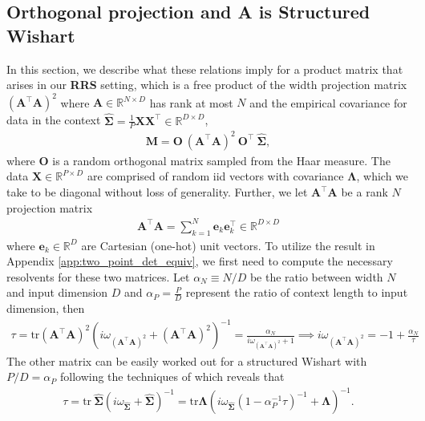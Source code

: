 \documentclass{article} %
\begin{document}
\subsection{Orthogonal projection and A is Structured Wishart}\label{app:orthogonal_proj_structured_Wishart}

In this section, we describe what these relations imply for a product matrix that arises in our \textbf{RRS} setting, which is a free product of the width projection matrix $(\bm A^\top \bm A)^2$ where $\bm A \in \mathbb{R}^{N \times D}$ has rank at most $N$ and the empirical covariance for data in the context $\hat{\bm\Sigma} = \frac{1}{P} \bm X \bm X^\top \in \mathbb{R}^{D\times D}$,
\begin{align}
    \bm M = \bm O \  \left( \bm A^\top \bm A \right)^2 \  \bm O^\top \ \hat{\bm\Sigma} ,
\end{align}
where $\bm O$ is a random orthogonal matrix sampled from the Haar measure. The data $\bm X \in \mathbb{R}^{P \times D}$ are comprised of random iid vectors with covariance $\bm\Lambda$, which we take to be diagonal without loss of generality. Further, we let $\bm A^\top \bm A$ be a rank $N$ projection matrix
\begin{align}
      \bm A^\top \bm A  =  \sum_{k=1}^N \bm e_k \bm e_k^\top \in \mathbb{R}^{D \times D}
\end{align}
where $\bm e_k \in \mathbb{R}^{D}$ are Cartesian (one-hot) unit vectors. To utilize the result in Appendix \ref{app:two_point_det_equiv}, we first need to compute the necessary resolvents for these two matrices. Let $\alpha_N \equiv N/D$ be the ratio between width $N$ and input dimension $D$ and $\alpha_P = \frac{P}{D}$ represent the ratio of context length to input dimension, then   
\begin{align}
    \tau = \text{tr} (\bm A^\top \bm A)^2 \left( i\omega_{(\bm A^\top \bm A)^2} +  (\bm A^\top \bm A)^2  \right)^{-1} = \frac{\alpha_N}{i\omega_{(\bm A^\top \bm A)^2} + 1} \implies i\omega_{(\bm A^\top \bm A)^2} = - 1 + \frac{\alpha_N}{\tau}
\end{align}
The other matrix can be easily worked out for a structured Wishart with $P/D = \alpha_P$ following the techniques of \cite{bordelon2024dynamical} which reveals that 
\begin{align}
    \tau = \text{tr} \  \hat{\bm\Sigma} \left( i \omega_{\hat{\bm\Sigma}} +  \hat{\bm\Sigma} \right)^{-1} =   \text{tr} \bm\Lambda \left( i \omega_{\hat{\bm\Sigma}} (1-\alpha_P^{-1} \tau)^{-1} + \bm\Lambda \right)^{-1} .
\end{align}
\end{document}
